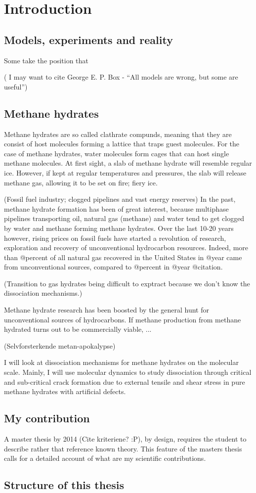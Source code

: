 \chapter{Introduction}
\section{Models, experiments and reality}
Some take the position that 

( I may want to cite George E. P. Box - ``All models are wrong, but some are useful'')

\section{Methane hydrates}
Methane hydrates are so called clathrate compunds, meaning that they are consist of host molecules forming a lattice that traps guest molecules. For the case of methane hydrates, water molecules form cages that can host single methane molecules. At first sight, a slab of methane hydrate will resemble regular ice. However, if kept at regular temperatures and pressures, the slab will release methane gas, allowing it to be set on fire; fiery ice. 

(Fossil fuel industry; clogged pipelines and vast energy reserves)
In the past, methane hydrate formation has been of great interest, because multiphase pipelines transporting oil, natural gas (methane) and water tend to get clogged by water and methane forming methane hydrates. Over the last 10-20 years however, rising prices on fossil fuels have started a revolution of research, exploration and recovery of unconventional hydrocarbon resources. Indeed, more than @percent of all natural gas recovered in the United States in @year came from unconventional sources, compared to @percent in @year @citation. 

(Transition to gas hydrates being difficult to exptract because we don't know the dissociation mechanisms.)

Methane hydrate research has been boosted by the general hunt for unconventional sources of hydrocarbons. If methane production from methane hydrated turns out to be commercially viable, ...

(Selvforsterkende metan-apokalypse)

I will look at dissociation mechanisms for methane hydrates on the molecular scale. Mainly, I will use molecular dynamics to study dissociation through critical and sub-critical crack formation due to external tensile and shear stress in pure methane hydrates with artificial defects. 

\section{My contribution}
A master thesis by 2014 (Cite kriteriene? :P), by design, requires the student to describe rather that reference known theory. This feature of the masters thesis calls for a detailed account of what are my scientific contributions. 
\section{Structure of this thesis}

